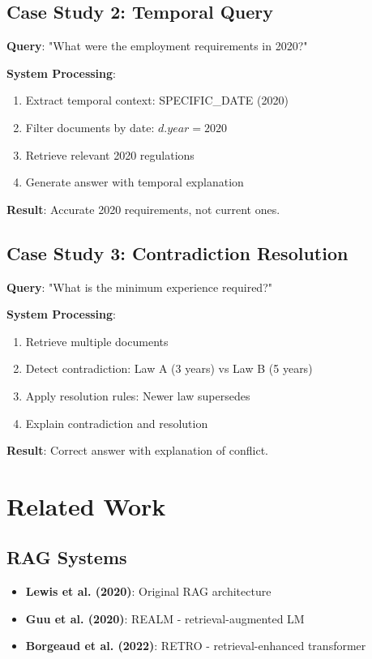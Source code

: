 \documentclass[12pt,a4paper]{article}
\begin{document}
\subsection{Case Study 2: Temporal Query}

\textbf{Query}: "What were the employment requirements in 2020?"

\textbf{System Processing}:
\begin{enumerate}
    \item Extract temporal context: SPECIFIC\_DATE (2020)
    \item Filter documents by date: $d.year = 2020$
    \item Retrieve relevant 2020 regulations
    \item Generate answer with temporal explanation
\end{enumerate}

\textbf{Result}: Accurate 2020 requirements, not current ones.

\subsection{Case Study 3: Contradiction Resolution}

\textbf{Query}: "What is the minimum experience required?"

\textbf{System Processing}:
\begin{enumerate}
    \item Retrieve multiple documents
    \item Detect contradiction: Law A (3 years) vs Law B (5 years)
    \item Apply resolution rules: Newer law supersedes
    \item Explain contradiction and resolution
\end{enumerate}

\textbf{Result}: Correct answer with explanation of conflict.

\section{Related Work}

\subsection{RAG Systems}
\begin{itemize}
    \item \textbf{Lewis et al. (2020)}: Original RAG architecture
    \item \textbf{Guu et al. (2020)}: REALM - retrieval-augmented LM
    \item \textbf{Borgeaud et al. (2022)}: RETRO - retrieval-enhanced transformer
\end{itemize}
\end{document}
